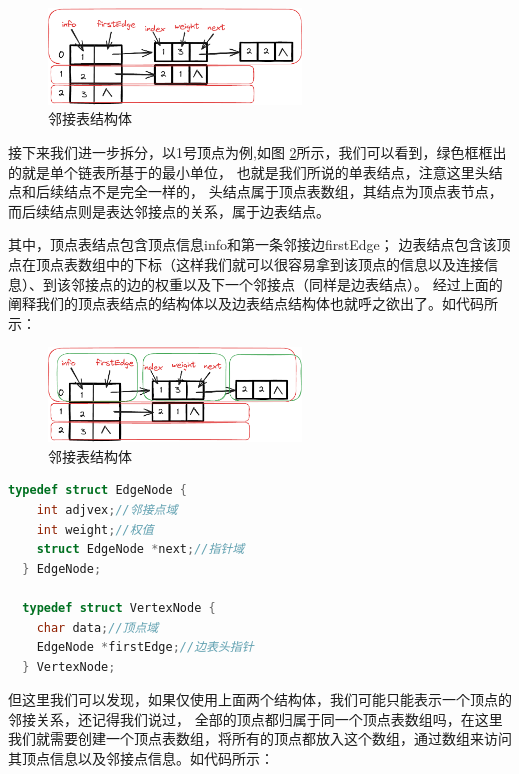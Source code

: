 \documentclass[lang=cn,newtx,10pt,scheme=chinese]{../elegantbook}
\begin{document}
\begin{figure}[!htbp]
  \centering
  \includegraphics[width=0.6\textwidth]{./figure/pdf/cropped/adjacencyList_struct.pdf}
  \caption{邻接表结构体}
  \label{fig:adjacencyList_struct}
\end{figure}

接下来我们进一步拆分，以1号顶点为例,如图 \ref{fig:adjacencyList_struct2}所示，我们可以看到，绿色框框出的就是单个链表所基于的最小单位，
也就是我们所说的单表结点，注意这里头结点和后续结点不是完全一样的，
头结点属于顶点表数组，其结点为顶点表节点，而后续结点则是表达邻接点的关系，属于边表结点。

其中，顶点表结点包含顶点信息info和第一条邻接边firstEdge；
边表结点包含该顶点在顶点表数组中的下标（这样我们就可以很容易拿到该顶点的信息以及连接信息）、到该邻接点的边的权重以及下一个邻接点（同样是边表结点）。
经过上面的阐释我们的顶点表结点的结构体以及边表结点结构体也就呼之欲出了。如代码所示：

\begin{figure}[!htbp]
  \centering
  \includegraphics[width=0.6\textwidth]{./figure/pdf/cropped/adjacencyList_struct2.pdf}
  \caption{邻接表结构体}
  \label{fig:adjacencyList_struct2}

\end{figure}

\begin{lstlisting}[language=C++, caption={邻接表结构体}]
  typedef struct EdgeNode {
    int adjvex;//邻接点域
    int weight;//权值
    struct EdgeNode *next;//指针域
  } EdgeNode;

  typedef struct VertexNode {
    char data;//顶点域
    EdgeNode *firstEdge;//边表头指针
  } VertexNode;

\end{lstlisting}

但这里我们可以发现，如果仅使用上面两个结构体，我们可能只能表示一个顶点的邻接关系，还记得我们说过，
全部的顶点都归属于同一个顶点表数组吗，在这里我们就需要创建一个顶点表数组，将所有的顶点都放入这个数组，通过数组来访问其顶点信息以及邻接点信息。如代码所示：
\end{document}
